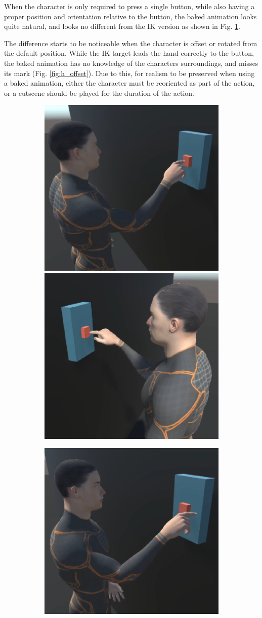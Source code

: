 When the character is only required to press a single button, while also having
a proper position and orientation relative to the button, the baked animation
looks quite natural, and looks no different from the IK version as shown in Fig.
\ref{fig:h_single}.


The difference starts to be noticeable when the character is offset or rotated
from the default position. While the IK target leads the hand correctly to the
button, the baked animation has no knowledge of the characters surroundings, and
misses its mark (Fig. \ref{fig:h_offset}). Due to this, for realism to be
preserved when using a baked animation, either the character must be reoriented
as part of the action, or a cutscene should be played for the duration of the
action. 


\begin{figure}
    \centering
    \captionsetup{justification=centering}
    \begin{subfigure}{\textwidth}
        \centering
        \includegraphics[width=0.4\linewidth]{grafika/h_b_single.eps}
        \hspace{0.1cm}
        \includegraphics[width=0.4\linewidth]{grafika/h_ik_single.eps}
        \subcaption{}
        \label{fig:h_single}
    \end{subfigure}
    \begin{subfigure}{\textwidth}
        \centering
        \includegraphics[width=0.4\linewidth]{grafika/h_b_offset.eps}

\end{subfigure}
\end{figure}
